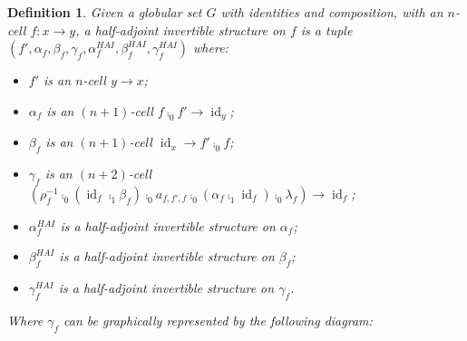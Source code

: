 \documentclass{article}
\newtheorem{definition}[theorem]{Definition} \theoremstyle{remark}
\DeclareMathOperator{\id}{id}
\begin{document}
\begin{definition}
  Given a globular set \(G\) with identities and composition, with an
  \(n\)-cell \(f : x \to y\), a \emph{half-adjoint invertible}
  structure on \(f\) is a
  tuple \((f', \alpha_f, \beta_f, \gamma_f, \alpha_f^{HAI},
  \beta_f^{HAI}, \gamma_f^{HAI})\) where:
  \begin{itemize}
  \item \(f'\) is an \(n\)-cell \(y \to x\);
  \item \(\alpha_f\) is an \((n+1)\)-cell \(f \comp_0 f' \to \id_y\);
  \item \(\beta_f\) is an \((n+1)\)-cell \(\id_x \to f' \comp_0 f\);
  \item \(\gamma_f\) is an \((n+2)\)-cell \((\rho_{f}^{-1} \comp_0
    (\id_f \comp_1 \beta_f) \comp_0 a_{f,f',f} \comp_0 (\alpha_f \comp_1 \id_f) \comp_0 \lambda_{f}) \to \id_{f}\);
  \item \(\alpha_f^{HAI}\) is a half-adjoint invertible structure on
    \(\alpha_f\);
  \item \(\beta_f^{HAI}\) is a half-adjoint invertible structure on
    \(\beta_f\);
  \item \(\gamma_f^{HAI}\) is a half-adjoint invertible structure on
    \(\gamma_f\).
  \end{itemize}

  Where \(\gamma_f\) can be graphically represented by the following
  diagram:
  \begin{center}
  \end{center}
\end{definition}
\end{document}
